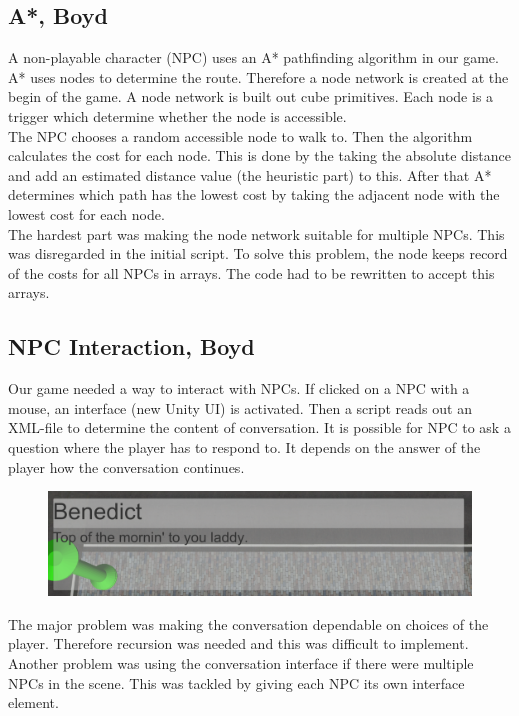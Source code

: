 \documentclass{article}
\begin{document}
\subsection{A*, Boyd}
A  non-playable character (NPC) uses an A* pathfinding algorithm in our game. A* uses nodes to determine the route. Therefore a node network is created at the begin of the game. A node network is built out cube primitives. Each node is a trigger which determine whether the node is accessible. \\
The NPC chooses a random accessible node to walk to. Then the algorithm calculates the cost for each node. This is done by the taking the absolute distance and add an estimated distance value (the heuristic part) to this. After that A* determines which path has the lowest cost by taking the adjacent node with the lowest cost for each node.\\
The hardest part was making the node network  suitable for multiple NPCs. This was disregarded in the initial script. To solve this problem, the node keeps record of the costs for all NPCs in arrays.  The code had to be rewritten to accept this arrays.

\subsection{NPC Interaction, Boyd}
Our game needed a way to interact with NPCs. If clicked on a NPC with a mouse, an interface (new Unity UI) is activated. Then a script reads out an XML-file to determine the content of conversation. It is possible for NPC to ask a question where the player has to respond to. It depends on the answer of the player how the conversation continues. \\

	\begin{figure}[ht!]
		\centering
		\includegraphics[width=120mm]{images/Conversation.png}
	\end{figure}

The major problem was making the conversation dependable on choices of the player. Therefore recursion was needed and this was difficult to implement. \\
Another problem was using the conversation interface if there were multiple NPCs in the scene. This was tackled by giving each NPC its own interface element. 
\end{document}
